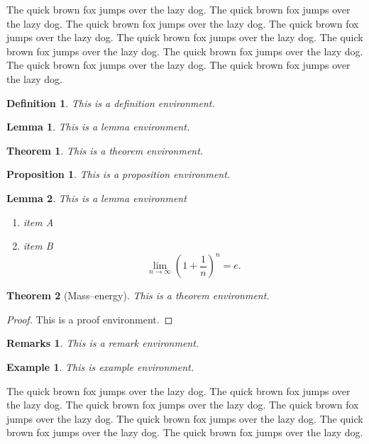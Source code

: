 \documentclass[openany,twoside,12pt]{book}
\theoremstyle{plain}
\newtheorem{definition}{Definition}[chapter]
\newtheorem{proposition}{Proposition}[chapter]
\newtheorem{lemma}{Lemma}[chapter]
\newtheorem{theorem}{Theorem}[chapter]
\newtheorem{example}{Example}[chapter]
\newtheorem{remark}{Remarks}[chapter]
\numberwithin{equation}{chapter}
\numberwithin{figure}{chapter}
\numberwithin{table}{chapter}
\begin{document}
The quick brown fox jumps over the lazy dog. The quick brown fox jumps over the lazy dog. The quick brown fox jumps over the lazy dog. The quick brown fox jumps over the lazy dog. The quick brown fox jumps over the lazy dog. The quick brown fox jumps over the lazy dog. The quick brown fox jumps over the lazy dog. The quick brown fox jumps over the lazy dog. The quick brown fox jumps over the lazy dog.

\begin{definition}
This is a definition environment.
\end{definition}

\begin{lemma}
This is a lemma environment.
\end{lemma}

\begin{theorem}
This is a theorem environment.
\end{theorem}

\begin{proposition}
This is a proposition environment.
\end{proposition}

\begin{lemma}
This is a lemma environment
\begin{enumerate}[label=\rm (\roman*)]
  \item item A
  \item item B
  \begin{equation}\label{eq:limite}
    \lim_{n\to\infty}\left(1+\frac{1}{n}\right)^n=e.
  \end{equation}
\end{enumerate}
\end{lemma}

\begin{theorem}[Mass--energy]
This is a theorem environment.
\end{theorem}
\begin{proof}
  This is a proof environment.
\end{proof}

\begin{remark}
  This is a remark environment.
\end{remark}

\begin{example}
  This is example environment.
\end{example}

The quick brown fox jumps over the lazy dog. The quick brown fox jumps over the lazy dog. The quick brown fox jumps over the lazy dog. The quick brown fox jumps over the lazy dog. The quick brown fox jumps over the lazy dog. The quick brown fox jumps over the lazy dog. The quick brown fox jumps over the lazy dog.
\end{document}
